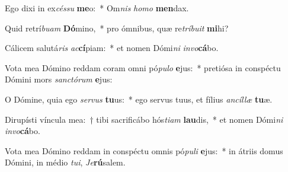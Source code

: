 \item Ego dixi in ex\textit{cés}\textit{su} \textbf{me}o:~* Om\textit{nis} \textit{ho}\textit{mo} \textbf{men}dax.
\item Quid retrí\textit{bu}\textit{am} \textbf{Dó}mino,~* pro ómnibus, quæ re\textit{trí}\textit{bu}\textit{it} \textbf{mi}hi?
\item Cálicem salutá\textit{ris} \textit{ac}\textbf{cí}piam:~* et nomen Dómi\textit{ni} \textit{in}\textit{vo}\textbf{cá}bo.
\item Vota mea Dómino reddam coram omni pó\textit{pu}\textit{lo} \textbf{e}jus:~* pretiósa in conspéctu Dómini mors \textit{sanc}\textit{tó}\textit{rum} \textbf{e}jus:
\item O Dómine, quia ego \textit{ser}\textit{vus} \textbf{tu}us:~* ego servus tuus, et fílius \textit{an}\textit{cíl}\textit{læ} \textbf{tu}æ.
\item Dirupísti víncula mea:~† tibi sacrificábo hós\textit{ti}\textit{am} \textbf{lau}dis,~* et nomen Dómi\textit{ni} \textit{in}\textit{vo}\textbf{cá}bo.
\item Vota mea Dómino reddam in conspéctu omnis pó\textit{pu}\textit{li} \textbf{e}jus:~* in átriis domus Dómini, in médio \textit{tu}\textit{i}, \textit{Je}\textbf{rú}salem.
